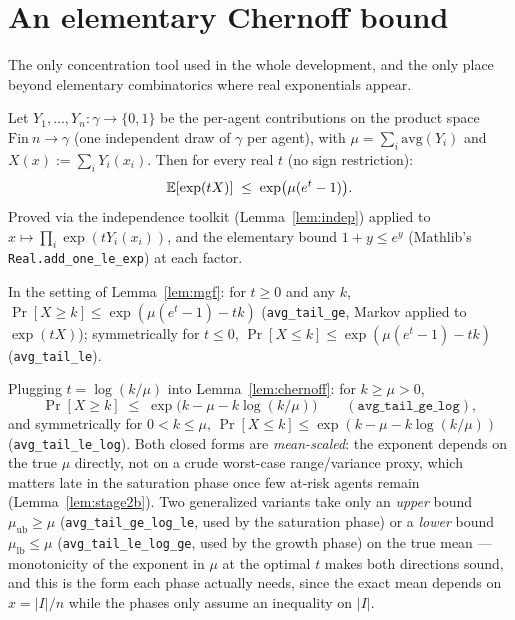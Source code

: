 \section{An elementary Chernoff bound}\label{sec:chernoff}

The only concentration tool used in the whole development, and the only
place beyond elementary combinatorics where real exponentials appear.

\begin{lemma}\label{lem:mgf}
  \leanok
  Let $Y_1,\dots,Y_n \colon \gamma \to \{0,1\}$ be the per-agent
  contributions on the product space $\mathrm{Fin}\ n \to \gamma$ (one
  independent draw of $\gamma$ per agent), with $\mu=\sum_i\mathrm{avg}(Y_i)$
  and $X(x) := \sum_i Y_i(x_i)$. Then for every real $t$ (no sign
  restriction):
  \[
    \mathbb{E}[\exp(tX)] \;\le\; \exp\bigl(\mu(e^t-1)\bigr).
  \]
  Proved via the independence toolkit (Lemma~\ref{lem:indep}) applied to
  $x \mapsto \prod_i \exp(tY_i(x_i))$, and the elementary bound
  $1+y\le e^y$ (Mathlib's \texttt{Real.add\_one\_le\_exp}) at each factor.
\end{lemma}

\begin{lemma}\label{lem:chernoff}
  \leanok
  In the setting of Lemma~\ref{lem:mgf}: for $t\ge0$ and any $k$,
  $\Pr[X\ge k] \le \exp(\mu(e^t-1)-tk)$ (\texttt{avg\_tail\_ge}, Markov
  applied to $\exp(tX)$); symmetrically for $t\le0$,
  $\Pr[X\le k] \le \exp(\mu(e^t-1)-tk)$ (\texttt{avg\_tail\_le}).
\end{lemma}

\begin{lemma}\label{lem:chernofflog}
  \leanok
  Plugging $t=\log(k/\mu)$ into Lemma~\ref{lem:chernoff}: for $k\ge\mu>0$,
  \[
    \Pr[X\ge k] \;\le\; \exp\bigl(k-\mu-k\log(k/\mu)\bigr)
    \qquad(\texttt{avg\_tail\_ge\_log}),
  \]
  and symmetrically for $0<k\le\mu$,
  $\Pr[X\le k] \le \exp(k-\mu-k\log(k/\mu))$ (\texttt{avg\_tail\_le\_log}).
  Both closed forms are \emph{mean-scaled}: the exponent depends on the true
  $\mu$ directly, not on a crude worst-case range/variance proxy, which
  matters late in the saturation phase once few at-risk agents remain
  (Lemma~\ref{lem:stage2b}). Two generalized variants take only an
  \emph{upper} bound $\mu_{\mathrm{ub}}\ge\mu$ (\texttt{avg\_tail\_ge\_log\_le},
  used by the saturation phase) or a \emph{lower} bound $\mu_{\mathrm{lb}}
  \le\mu$ (\texttt{avg\_tail\_le\_log\_ge}, used by the growth phase) on the
  true mean --- monotonicity of the exponent in $\mu$ at the optimal $t$
  makes both directions sound, and this is the form each phase actually
  needs, since the exact mean depends on $x=|I|/n$ while the phases only
  assume an inequality on $|I|$.
\end{lemma}


